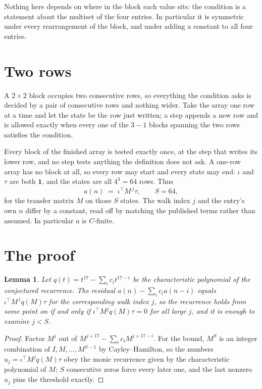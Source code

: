 \documentclass[11pt,a4paper]{article}
\theoremstyle{plain}
\newtheorem{lemma}[theorem]{Lemma}
\theoremstyle{definition}
\begin{document}
Nothing here depends on where in the block each value sits: the condition is a statement about
the multiset of the four entries. In particular it is symmetric under every rearrangement of
the block, and under adding a constant to all four entries.

\section{Two rows}

A $2\times2$ block occupies two consecutive rows, so everything the condition asks is decided
by a pair of consecutive rows and nothing wider. Take the array one row at a time and let the
state be the row just written; a step appends a new row and is allowed exactly when every one
of the $3-1$ blocks spanning the two rows satisfies the condition.

Every block of the finished array is tested exactly once, at the step that writes its lower
row, and no step tests anything the definition does not ask. A one-row array has no block at
all, so every row may start and every state may end: $\iota$ and $\tau$ are both
$\mathbf{1}$, and the states are all $4^{3}=64$ rows. Thus
\[
a(n)\;=\;\iota^{\!\top}M^{\,j}\tau ,\qquad S=64,
\]
for the transfer matrix $M$ on those $S$ states. The walk index $j$ and the entry's own $n$
differ by a constant, read off by matching the published terms rather than assumed. In
particular $a$ is $C$-finite.

\section{The proof}

\begin{lemma}\label{lem:crit}
Let $q(t)=t^{17}-\sum_i c_it^{17-i}$ be the characteristic polynomial of the
conjectured recurrence. The residual $a(n)-\sum_ic_ia(n-i)$ equals
$\iota^{\!\top}M^{\,j}q(M)\tau$ for the corresponding walk index $j$, so the recurrence
holds from some point on if and only if $\iota^{\!\top}M^{j}q(M)\tau=0$ for all large $j$,
and it is enough to examine $j<S$.
\end{lemma}

\begin{proof}
Factor $M^{j}$ out of $M^{j+17}-\sum_ic_iM^{j+17-i}$. For the bound, $M^{S}$
is an integer combination of $I,M,\dots,M^{S-1}$ by Cayley--Hamilton, so the numbers
$u_j=\iota^{\!\top}M^{j}q(M)\tau$ obey the monic recurrence given by the characteristic
polynomial of $M$; $S$ consecutive zeros force every later one, and the last nonzero $u_j$
pins the threshold exactly.
\end{proof}
\end{document}
